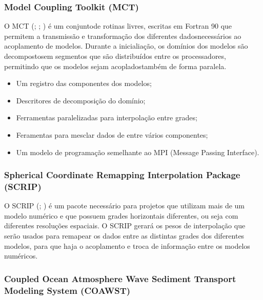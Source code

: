 \documentclass{article}
\begin{document}
\subsubsection{Model Coupling Toolkit (MCT)}
\bigskip

O MCT (\cite{Jacob2005}; \cite{Larson2005}; \cite{Warner2008}) é um conjuntode rotinas livres, escritas em Fortran 90 que 
permitem a transmissão e transformação dos diferentes dadosnecessários ao acoplamento de modelos. Durante a inicialiação, 
os domínios dos modelos são decompostosem segmentos que são distribuídos entre os processadores, permitindo que os 
modelos sejam acopladostambém de forma paralela.

\begin{itemize}
	\item Um registro das componentes dos modelos;
	\item Descritores de decomposição do domínio;
	\item Ferramentas paralelizadas para interpolação entre grades;
	\item Feramentas para mesclar dados de entre vários componentes;
	\item Um modelo de programação semelhante ao MPI (Message Passing Interface).
\end{itemize}

\subsubsection{Spherical Coordinate Remapping Interpolation Package (SCRIP)}
\bigskip

O SCRIP (\cite{Jones1998}; \cite{Jones1999}) é um pacote necessário para projetos que utilizam mais de um modelo numérico e que possuem 
grades horizontais diferentes, ou seja com diferentes resoluções espaciais. O SCRIP gerará os pesos de interpolação que serão usados 
para remapear os dados entre as distintas grades dos diferentes modelos, para que haja o acoplamento e troca de informação entre os modelos numéricos.

\subsubsection{Coupled Ocean Atmosphere Wave Sediment Transport Modeling System (COAWST)}
\bigskip
\end{document}
